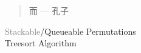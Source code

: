 \begin{frame}{}

  \pause

  \pause
  \begin{quote}
    \centerline{\Large {}而 --- {\large 孔子}}
  \end{quote}
\end{frame}

\begin{frame}{}
  \begin{center}
    {\LARGE
      \textcolor{gray}{Stackable}/Queueable Permutations \\[0.50cm]
      Treesort Algorithm
    }
  \end{center}
\end{frame}
